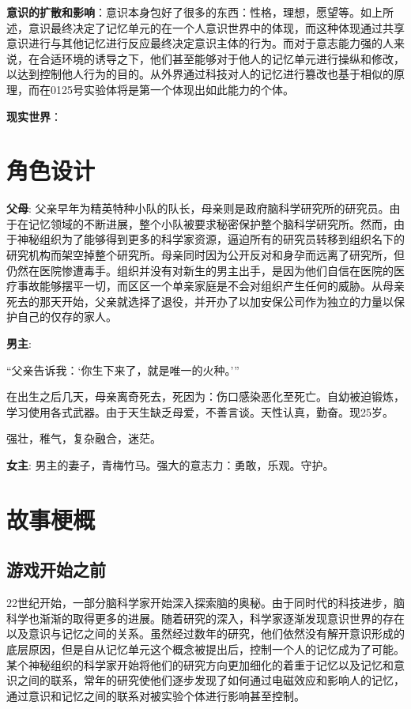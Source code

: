 \documentclass[12pt, a4paper]{article}
\begin{document}
        \medskip
        \textbf{意识的扩散和影响}：意识本身包好了很多的东西：性格，理想，愿望等。如上所述，意识最终决定了记忆单元的在一个人意识世界中的体现，而这种体现通过共享意识进行与其他记忆进行反应最终决定意识主体的行为。而对于意志能力强的人来说，在合适环境的诱导之下，他们甚至能够对于他人的记忆单元进行操纵和修改，以达到控制他人行为的目的。从外界通过科技对人的记忆进行篡改也基于相似的原理，而在0125号实验体将是第一个体现出如此能力的个体。

        \medskip
        \textbf{现实世界}：
            

    \newpage        
    \section*{角色设计}

        \textbf{父母}:
            父亲早年为精英特种小队的队长，母亲则是政府脑科学研究所的研究员。由于在记忆领域的不断进展，整个小队被要求秘密保护整个脑科学研究所。然而，由于神秘组织为了能够得到更多的科学家资源，逼迫所有的研究员转移到组织名下的研究机构而架空掉整个研究所。母亲同时因为公开反对和身孕而远离了研究所，但仍然在医院惨遭毒手。组织并没有对新生的男主出手，是因为他们自信在医院的医疗事故能够摆平一切，而区区一个单亲家庭是不会对组织产生任何的威胁。从母亲死去的那天开始，父亲就选择了退役，并开办了以加安保公司作为独立的力量以保护自己的仅存的家人。 

        \textbf{男主}:

            “父亲告诉我：‘你生下来了，就是唯一的火种。’” 
            
            在出生之后几天，母亲离奇死去，死因为：伤口感染恶化至死亡。自幼被迫锻炼，学习使用各式武器。由于天生缺乏母爱，不善言谈。天性认真，勤奋。现25岁。

            强壮，稚气，复杂融合，迷茫。

        \medskip
        \textbf{女主}:  
            男主的妻子，青梅竹马。强大的意志力：勇敢，乐观。守护。 
            
    \newpage 
    \section*{故事梗概}
    \subsection*{游戏开始之前}
        22世纪开始，一部分脑科学家开始深入探索脑的奥秘。由于同时代的科技进步，脑科学也渐渐的取得更多的进展。随着研究的深入，科学家逐渐发现意识世界的存在以及意识与记忆之间的关系。虽然经过数年的研究，他们依然没有解开意识形成的底层原因，但是自从记忆单元这个概念被提出后，控制一个人的记忆成为了可能。某个神秘组织的科学家开始将他们的研究方向更加细化的着重于记忆以及记忆和意识之间的联系，常年的研究使他们逐步发现了如何通过电磁效应和影响人的记忆，通过意识和记忆之间的联系对被实验个体进行影响甚至控制。
\end{document}
